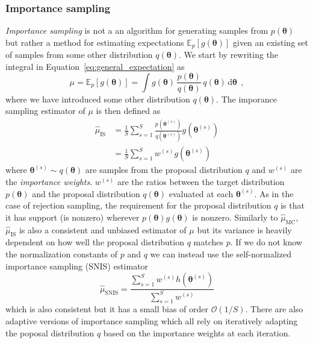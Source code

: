 \documentclass[12pt,dvipsnames]{report}
\newcommand{\ud}{\,\mathrm{d}}
\renewcommand{\vec}[1]{\boldsymbol{\mathbf{#1}}}
\newcommand{\hquad}{~~}
\begin{document}
\subsubsection{Importance sampling}
\textsl{Importance sampling} is not a an algorithm for generating samples from
$p(\vec{\theta})$ but rather a method for estimating expectations
$\mathbb{E}_p[g(\vec{\theta})]$ given an existing set of samples from
some other distribution $q(\vec{\theta})$. We start by rewriting the integral 
in Equation~\ref{eq:general_expectation} as 
\begin{equation}
    \mu = \mathbb{E}_{p}[g(\vec \theta)]=\int g(\vec \theta)\,\frac{p(\vec \theta)}{q(\vec \theta)}\,q(\vec \theta) \ud \vec \theta\hquad ,
\end{equation}
where we have introduced some other distribution $q(\vec \theta)$.
The imporance sampling estimator of $\mu$ is then defined as
\begin{align}
    \hat{\mu}_{\mathrm{IS}}&=\frac{1}{S} \sum_{s=1}^{S} \frac{p\left(\boldsymbol{\theta}^{(s)}\right)}{q\left(\boldsymbol{\theta}^{(s)}\right)} g\left(\boldsymbol{\theta}^{(s)}\right)\\
    &=\frac{1}{S} \sum_{s=1}^{S} w^{(s)} g\left(\boldsymbol{\theta}^{(s)}\right)
\end{align}
where  $\boldsymbol{\theta}^{(s)} \sim q(\boldsymbol{\theta})$ are samples from the 
proposal distribution $q$ and $w^{(s)}$ are the \textsl{importance weights}. 
$w^{(s)}$  are the ratios between the target distribution $p(\vec \theta)$ and 
the proposal distribution $q(\vec \theta)$ evaluated at each $\vec{\theta}^{(s)}$.
As in the case of rejection sampling, the requirement for the proposal distribution $q$
is that it has support (is nonzero) wherever $p(\boldsymbol{\theta}) g(\boldsymbol{\theta})$
is nonzero.
Similarly to $\hat{\mu}_{\mathrm{MC}}$,  $\hat{\mu}_{\mathrm{IS}}$ is also a 
consistent and  unbiased estimator of $\mu$ but its variance is heavily dependent on 
how well the proposal distribution $q$ matches $p$. 
If we do not know the normalization constants of $p$ and $q$ we can instead use the 
self-normalized importance sampling (SNIS)  estimator 
\begin{equation}
    \hat{\mu}_{\mathrm{SNIS}}=\frac{\sum_{s=1}^{S} w^{(s)} h\left(\boldsymbol{\theta}^{(s)}\right)}{\sum_{s=1}^{S} w^{(s)}}
\label{eq:importance_sampling_estimator}
\end{equation}
which is also consistent but it has a small bias of order $\mathcal{O}(1/S)$.
There are also adaptive versions of importance sampling  which all rely on iteratively 
adapting the poposal distribution $q$ based on the importance weights at each iteration. 
\end{document}

